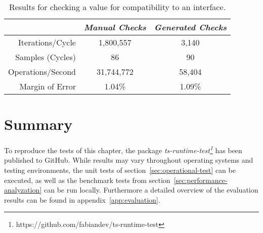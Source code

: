 \begin{table}[ht]
\begin{subtable}[ht]{1.0\textwidth}
    \setlength{\tabcolsep}{5mm}
    \def\arraystretch{1.25}
    \centering
    \begin{tabular}{|r||c|c|}
      \hline
      & \emph{Manual Checks} & \emph{Generated Checks} \\
      \hline
      \hline
      Iterations/Cycle & 1,800,557 & 3,140 \\
      \hline
      Samples (Cycles) & 86 & 90 \\
      \hline
      Operations/Second & 31,744,772 & 58,404 \\
      \hline
      Margin of Error & 1.04\% & 1.09\% \\
      \hline
    \end{tabular}
    \caption{Results for checking a value for compatibility to an interface.}
    \label{tab:benchmarks:interface}
  \end{subtable}
\end{table}

\section{Summary}
\label{sec:evaluation-summary}

To reproduce the tests of this chapter, the package \emph{ts-runtime-test\footnote{https://github.com/fabiandev/ts-runtime-test}} has been published to GitHub. While results may vary throughout operating systems and testing environments, the unit tests of section~\ref{sec:operational-test} can be executed, as well as the benchmark tests from section~\ref{sec:performance-analyzation} can be run locally. Furthermore a detailed overview of the evaluation results can be found in appendix~\ref{app:evaluation}.
